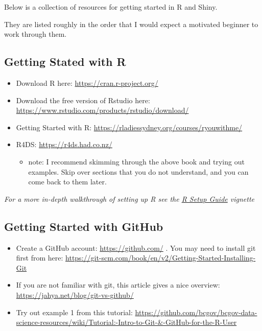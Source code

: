 \documentclass[
]{book}
\providecommand{\tightlist}{%
  \setlength{\itemsep}{0pt}\setlength{\parskip}{0pt}}
\begin{document}
Below is a collection of resources for getting started in R and Shiny.

They are listed roughly in the order that I would expect a motivated beginner
to work through them.

\hypertarget{getting-stated-with-r}{%
\subsection{Getting Stated with R}\label{getting-stated-with-r}}

\begin{itemize}
\tightlist
\item
  Download R here: \url{https://cran.r-project.org/}
\item
  Download the free version of Rstudio here: \url{https://www.rstudio.com/products/rstudio/download/}
\item
  Getting Started with R: \url{https://rladiessydney.org/courses/ryouwithme/}
\item
  R4DS: \url{https://r4ds.had.co.nz/}

  \begin{itemize}
  \tightlist
  \item
    note: I recommend skimming through the above book and trying out examples.
    Skip over sections that you do not understand, and you can come back to them
    later.
  \end{itemize}
\end{itemize}

\emph{For a more in-depth walkthrough of setting up R see the \href{https://jimbrig.github.io/rtraining/articles/setting-up-r.html}{R Setup Guide} vignette}

\hypertarget{getting-started-with-github}{%
\subsection{Getting Started with GitHub}\label{getting-started-with-github}}

\begin{itemize}
\tightlist
\item
  Create a GitHub account: \url{https://github.com/} . You may need to install git first from here: \url{https://git-scm.com/book/en/v2/Getting-Started-Installing-Git}
\item
  If you are not familiar with git, this article gives a nice overview: \url{https://jahya.net/blog/git-vs-github/}
\item
  Try out example 1 from this tutorial: \url{https://github.com/bcgov/bcgov-data-science-resources/wiki/Tutorial:-Intro-to-Git-\&-GitHub-for-the-R-User}
\end{itemize}
\end{document}
